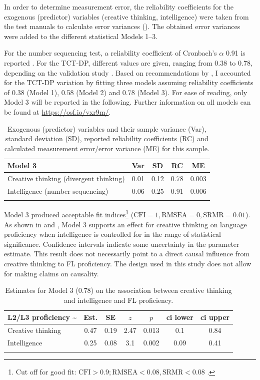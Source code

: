 \documentclass[output=paper]{langsci/langscibook}
\begin{document}
In order to determine measurement error, the reliability coefficients for the exogenous (predictor) variables (creative thinking, intelligence) were taken from the test manuals to calculate error variances (). The obtained error variances were added to the different statistical Models 1--3. 

For the number sequencing test, a reliability coefficient of Cronbach's $\alpha$ 0.91 is reported \citep{Weiss2006}. For the TCT-DP, different values are given, ranging from 0.38 to 0.78, depending on the validation study \citep{UrbanJellen1995}. Based on recommendations by \citet{WestfallYarkoni2016}, I accounted for the TCT-DP variation by fitting three models assuming reliability coefficients of 0.38 (Model 1), 0.58 (Model 2) and 0.78 (Model 3). For ease of reading, only Model 3 will be reported in the following. Further information on all models can be found at \url{https://osf.io/vxr9m/}.\largerpage 

\begin{table}
\caption{\label{tab:06:1}Exogenous (predictor) variables and their sample variance (Var), standard deviation (SD), reported reliability coefficients (RC) and calculated measurement error/error variance (ME) for this sample.}
\begin{tabular}{l cccc} 
\lsptoprule
Model 3 & {Var} & {SD} & {RC} & {ME} \\\midrule
Creative thinking (divergent thinking)      & 0.01 & 0.12 & 0.78 & 0.003\\
Intelligence (number sequencing)         & 0.06 & 0.25 & 0.91 & 0.006\\
\lspbottomrule
\end{tabular}
\end{table}

Model 3 produced acceptable fit indices\footnote{Cut off for good fit: $\text{CFI} > 0.9; \text{RMSEA} < 0.08, \text{SRMR} < 0.08$ \citep{Kline2011}.} ($\text{CFI} = 1, \text{RMSEA} = 0, \text{SRMR} = 0.01$). As shown in  and , Model 3 supports an effect for creative thinking on language proficiency when intelligence is controlled for in the range of statistical significance. Confidence intervals indicate some uncertainty in the parameter estimate. This result does not necessarily point to a direct causal influence from creative thinking to FL proficiency. The design used in this study does not allow for making claims on causality. 

\begin{table}
\caption{\label{tab:06:2}Estimates for Model 3 (0.78) on the association between creative thinking and intelligence and FL proficiency.}
\begin{tabular}{l SS SS SS}
\lsptoprule
{L2/L3 proficiency {\textasciitilde}} & {Est.} & {SE} & {$z$} & {$p$} & {ci lower} & {ci upper}\\\midrule
Creative thinking & 0.47 & 0.19 & 2.47 & 0.013 & 0.1 & 0.84\\
Intelligence      & 0.25 & 0.08 & 3.1 & 0.002 & 0.09 & 0.41\\
\lspbottomrule
\end{tabular}
\end{table}
\end{document}
